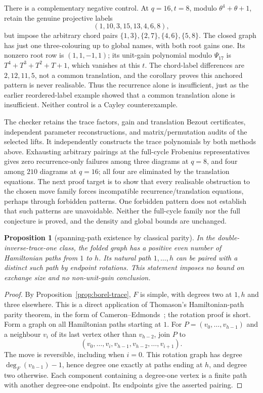 \documentclass[11pt,a4paper]{article}
\newtheorem{proposition}[theorem]{Proposition}
\theoremstyle{definition}
\theoremstyle{remark}
\begin{document}
There is a complementary negative control.  At $q=16,t=8$, modulo $\theta^4+\theta+1$, retain the genuine projective labels
\[
                   (1,10,3,15,13,4,6,8),
\]
but impose the arbitrary chord pairs $\{1,3\},\{2,7\},\{4,6\},\{5,8\}$.  The closed graph has just one three-colouring up to global names, with both root gains one.  Its nonzero root row is $(1,1,-1,1)$; its unit-gain polynomial modulo $\Psi_{17}$ is $T^4+T^3+T^2+T+1$, which vanishes at this $t$.  The chord-label differences are $2,12,11,5$, not a common translation, and the corollary proves this anchored pattern is never realisable.  Thus the recurrence alone is insufficient, just as the earlier reordered-label example showed that a common translation alone is insufficient.  Neither control is a Cayley counterexample.

The checker  retains the trace factors, gain and translation Bezout certificates, independent parameter reconstructions, and matrix/permutation audits of the selected lifts.  It independently constructs the trace polynomials by both methods above.  Exhausting arbitrary pairings at the full-cycle Frobenius representatives gives zero recurrence-only failures among three diagrams at $q=8$, and four among $210$ diagrams at $q=16$; all four are eliminated by the translation equations.  The next proof target is to show that every realisable obstruction to the chosen move family forces incompatible recurrence/translation equations, perhaps through forbidden patterns.  One forbidden pattern does not establish that such patterns are unavoidable.  Neither the full-cycle family nor the full conjecture is proved, and the density and global bounds are unchanged.

\begin{proposition}[spanning-path existence by classical parity]\label{prop:borel-rotations}
In the double-inverse-trace-one class, the folded graph has a positive even number of Hamiltonian paths from $1$ to $h$.  Its natural path $1,\ldots,h$ can be paired with a distinct such path by endpoint rotations.  This statement imposes no bound on exchange size and no non-unit-gain conclusion.
\end{proposition}
\begin{proof}
By Proposition~\ref{prop:borel-trace}, $F$ is simple, with degrees two at $1,h$ and three elsewhere.  This is a direct application of Thomason's Hamiltonian-path parity theorem, in the form of Cameron--Edmonds~\cite[Theorem~$0'$]{CameronEdmonds99}; the rotation proof is short.  Form a graph on all Hamiltonian paths starting at $1$.  For $P=(v_0,\ldots,v_{h-1})$ and a neighbour $v_i$ of its last vertex other than $v_{h-2}$, join $P$ to
\[
       (v_0,\ldots,v_i,v_{h-1},v_{h-2},\ldots,v_{i+1}).
\]
The move is reversible, including when $i=0$.  This rotation graph has degree $\deg_F(v_{h-1})-1$, hence degree one exactly at paths ending at $h$, and degree two otherwise.  Each component containing a degree-one vertex is a finite path with another degree-one endpoint.  Its endpoints give the asserted pairing.
\end{proof}
\end{document}
